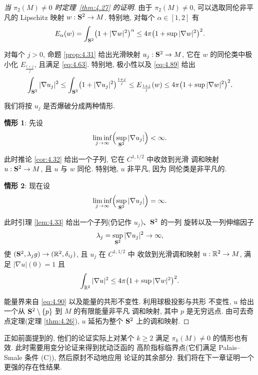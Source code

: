 \begin{proof}[当 $\pi_2(M)\neq0$ 时定理~\ref{thm:4.27} 的证明]
由于 $\pi_2(M)\neq0$, 可以选取同伦非平凡的 Lipschitz 映射
$w:\mathbf{S}^2\to M$. 特别地, 对每个 $\alpha\in[1,2]$ 有
\begin{equation}
E_\alpha(w)=\int_{\mathbf{S}^2}\bigl(1+|\nabla w|^2\bigr)^\alpha
 \leq4\pi\bigl(1+\sup|\nabla w|^2\bigr)^2.
\label{eq:4.89}
\end{equation}

对每个 $j>0$, 命题 \ref{prop:4.31} 给出光滑映射 $u_j:\mathbf{S}^2\to M$,
它在 $w$ 的同伦类中极小化 $E_{\frac{1+j}{j}}$, 且满足 \eqref{eq:4.63}.
特别地, 极小性以及 \eqref{eq:4.89} 给出
\begin{equation}
\int_{\mathbf{S}^2}|\nabla u_j|^2
 \leq\int_{\mathbf{S}^2}\bigl(1+|\nabla u_j|^2\bigr)^{\frac{1+j}{j}}
 \leq E_{\frac{1+j}{j}}(w)
 \leq4\pi\bigl(1+\sup|\nabla w|^2\bigr)^2.
\label{eq:4.90}
\end{equation}

我们将按 $u_j$ 是否爆破分成两种情形.

\textbf{情形 1}: 先设
\begin{equation*}
\liminf_{j\to\infty}\Bigl(\sup_{\mathbf{S}^2}|\nabla u_j|\Bigr)<\infty.
\end{equation*}

此时推论 \ref{cor:4.32} 给出一个子列, 它在 $C^{1,1/2}$ 中收敛到光滑
调和映射 $u:\mathbf{S}^2\to M$, 且 $u$ 与 $w$ 同伦. 特别地, $u$ 非平凡, 因为
同伦类是非平凡的.

\textbf{情形 2}: 现在设
\begin{equation*}
\liminf_{j\to\infty}\Bigl(\sup_{\mathbf{S}^2}|\nabla u_j|\Bigr)=\infty.
\end{equation*}

此时引理 \ref{lem:4.33} 给出一个子列(仍记作 $u_j$)、$\mathbf{S}^2$ 的一列
旋转以及一列伸缩因子
\begin{equation*}
\lambda_j=\sup_{\mathbf{S}^2}|\nabla u_j|^2\to\infty,
\end{equation*}
使 $(\mathbf{S}^2,\lambda_jg)\to(\mathbb{R}^2,\delta_{ij})$, 且 $u_j$ 在 $C^{1,1/2}$ 中
收敛到光滑调和映射 $u:\mathbb{R}^2\to M$, 满足 $|\nabla u|(0)=1$ 且
\begin{equation}
\int_{\mathbb{R}^2}|\nabla u|^2\leq4\pi\bigl(1+\sup|\nabla w|^2\bigr)^2.
\label{eq:4.91}
\end{equation}

能量界来自 \eqref{eq:4.90} 以及能量的共形不变性. 利用球极投影与共形
不变性, $u$ 给出一个从 $\mathbf{S}^2\setminus\{p\}$ 到 $M$ 的有限能量非平凡
调和映射, 其中 $p$ 是无穷远点. 由可去奇点定理(定理 \ref{thm:4.26}),
$u$ 延拓为整个 $\mathbf{S}^2$ 上的调和映射.
\end{proof}

正如前面提到的, 他们的论证实际上对某个 $k\geq2$ 满足
$\pi_k(M)\neq0$ 的情形也有效. 此时需要用变分论证来得到扰动泛函的
高阶指标临界点(它们满足 Palais--Smale 条件 (C)), 然后原封不动地应用
论证的其余部分. 我们将在下一章证明一个更强的存在性结果.
